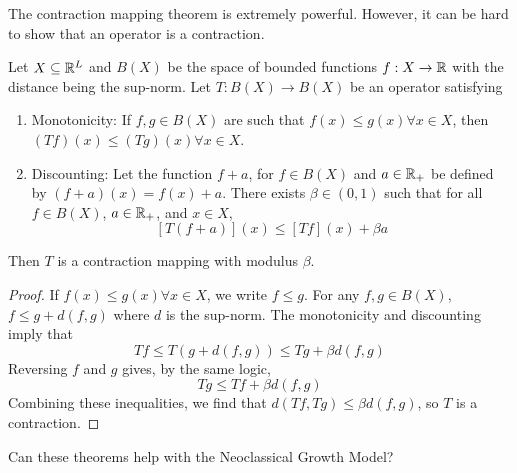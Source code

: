 \documentclass[10pt]{article}
\begin{document}
\begin{remark}
	The contraction mapping theorem is extremely powerful. However, it can be hard to show that an operator is a contraction. 
\end{remark}

\begin{theorem}\label{thm:blackwell}
	 Let $X \subseteq \mathbb{R}^L$ and $B(X)$ be the space of bounded functions $f: X \to \mathbb{R}$ with the distance being the sup-norm. Let $T: B(X) \to B(X)$ be an operator satisfying
	\begin{enumerate}
		\item Monotonicity: If $f,g \in B(X)$ are such that $f(x) \le g(x) \forall x \in X$, then $(Tf)(x) \le (Tg)(x) \forall x \in X$.
		\item Discounting: Let the function $f+a$, for $f \in B(X)$ and $a \in \mathbb{R}_+$ be defined by $(f+a)(x) = f(x) + a$. There exists $\beta \in (0,1)$ such that for all $f \in B(X)$, $a \in \mathbb{R}_+$, and $x \in X$,
		\[
		[T(f+a)](x) \le [Tf](x) + \beta a
		\]
	\end{enumerate}
	Then $T$ is a contraction mapping with modulus $\beta$.
\end{theorem}
\begin{proof}
	If $f(x) \le g(x) \forall x \in X$, we write $f \le g$. For any $f,g \in B(X)$, $f \le g + d(f,g)$ where $d$ is the sup-norm. The monotonicity and discounting imply that 
	\[
	Tf \le T(g + d(f,g)) \le Tg + \beta d(f,g)
	\]
	Reversing $f$ and $g$ gives, by the same logic,
	\[
	Tg \le Tf + \beta d(f,g)
	\]
	Combining these inequalities, we find that $d(Tf,Tg) \le \beta d(f,g)$, so $T$ is a contraction.
\end{proof}

Can these theorems help with the Neoclassical Growth Model?
\end{document}
